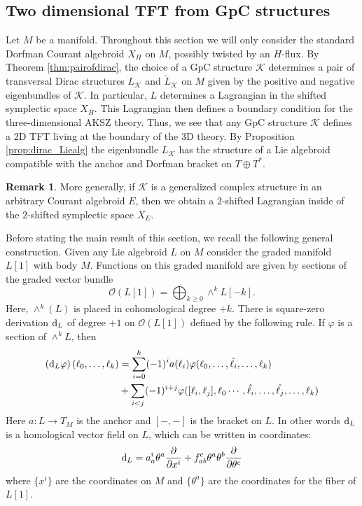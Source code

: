 \documentclass{article}
\newcommand{\TT}{{T\oplus T^*}}
\newcommand{\KK}{\mathcal{K}}
\newcommand{\cO}{\mathcal{O}}
\def\d{{\rm d}}
\theoremstyle{definition}
\newtheorem{remark}[theorem]{Remark}
\theoremstyle{remark}
\begin{document}
\subsection{Two dimensional TFT from GpC structures}

Let $M$ be a manifold.
Throughout this section we will only consider the standard Dorfman Courant algebroid $X_H$ on $M$, possibly twisted by an $H$-flux.
By Theorem \ref{thm:pairofdirac}, the choice of a GpC structure $\KK$ determines a pair of transversal Dirac structures $L_{\KK}$ and $\tilde{L}_{\KK}$ on $M$ given by the positive and negative eigenbundles of $\KK$. 
In particular, $L$ determines a Lagrangian in the shifted symplectic space $X_{H}$. 
This Lagrangian then defines a boundary condition for the three-dimensional AKSZ theory.
Thus, we see that any GpC structure $\KK$ defines a 2D TFT living at the boundary of the 3D theory. 
By Proposition \ref{prop:dirac_Liealg} the eigenbundle $L_\KK$ has the structure of a Lie algebroid compatible with the anchor and Dorfman bracket on $\TT$. 

\begin{remark}
More generally, if $\KK$ is a generalized complex structure in an arbitrary Courant algebroid $E$, then we obtain a $2$-shifted Lagrangian inside of the $2$-shifted symplectic space $X_E$. 
\end{remark}

Before stating the main result of this section, we recall the following general construction.
Given any Lie algebroid $L$ on $M$ consider the graded manifold $L[1]$ with body $M$. 
Functions on this graded manifold are given by sections of the graded vector bundle
\[
\cO(L[1]) = \bigoplus_{k \geq 0} \wedge^k L [-k] .
\]
Here, $\wedge^k(L)$ is placed in cohomological degree $+k$. 
There is square-zero derivation $\d_L$ of degree $+1$ on $\cO(L[1])$ defined by the following rule. 
If $\varphi$ is a section of $\wedge^k L$, then
\begin{align*}
\left( \d_L \varphi \right) (\ell_0, \ldots, \ell_k) & = \sum_{i = 0}^k (-1)^i a (\ell_i) \varphi(\ell_0, \ldots, \Hat{\ell_i}, \ldots, \ell_k) \\ & + \sum_{i < j} (-1)^{i+j} \varphi([\ell_i, \ell_j] , \ell_0 \cdots, \Hat{\ell_i}, \ldots, \Hat{\ell_j}, \ldots, \ell_k)
\end{align*}
Here $a : L \to T_M$ is the anchor and $[-,-]$ is the bracket on $L$. 
In other words $\d_L$ is a homological vector field on $L$, which can be written in coordinates:
\[
\d_L = a_a^i \theta^a \frac{\partial}{\partial x^i} + f_{ab}^c \theta^a \theta^b \frac{\partial}{\partial \theta^c}
\]
where $\{x^i\}$ are the coordinates on $M$ and $\{\theta^a\}$ are the coordinates for the fiber of $L[1]$.
\end{document}

